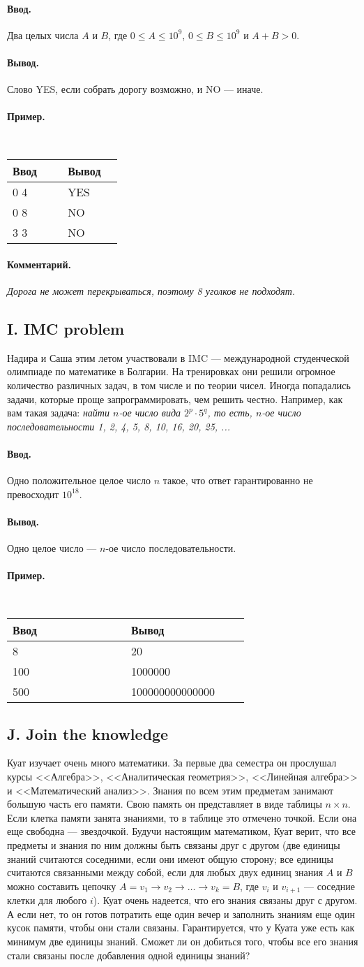 \documentclass[12pt, a4paper]{article}
\newcommand{\informat}[1]
{
	\paragraph{Ввод.\\} #1
}
\newcommand{\outformat}[1]
{
	\paragraph{Вывод.\\} #1
}
\newcommand{\exampleee}[6]
{
	\paragraph{Пример.\\}
	{\tt
	\begin{tabular}{|p{0.4\linewidth}|p{0.4\linewidth}|}
	\hline
	Ввод 	& Вывод  	\\
	\hline
	#1 		& #2 		\\
	\hline
	#3		& #4		\\
	\hline
	#5		& #6		\\
	\hline
	\end{tabular}
	}
}
\newcommand{\excomm}[1]
{
	\paragraph{Комментарий. \\}
	\textit{#1}
}
\begin{document}
\informat{Два целых числа $A$ и $B$, где $0 \le A \le 10^9$, $0 \le B \le 10^9$ и $A + B > 0$.}

\outformat{Слово YES, если собрать дорогу возможно, и NO --- иначе.}

\exampleee{0 4}{YES}{0 8}{NO}{3 3}{NO}

\excomm{Дорога не может перекрываться, поэтому 8 уголков не подходят.}


\subsection*{I. IMC problem}

Надира и Саша этим летом участвовали в IMC --- международной студенческой олимпиаде по математике в Болгарии. На тренировках они решили огромное количество различных задач, в том числе и по теории чисел. Иногда попадались задачи, которые проще запрограммировать, чем решить честно. Например, как вам такая задача:\newline
\textit{найти $n$-ое число вида $2^p \cdot 5^q$, то есть, $n$-ое число последовательности 1, 2, 4, 5, 8, 10, 16, 20, 25, ...}

\informat{Одно положительное целое число $n$ такое, что ответ гарантированно не превосходит $10^{18}$.}

\outformat{Одно целое число --- $n$-ое число последовательности.}

\exampleee{8}{20}{100}{1000000}{500}{100000000000000}

\newpage

\subsection*{J. Join the knowledge}

Куат изучает очень много математики. За первые два семестра он прослушал курсы <<Алгебра>>, <<Аналитическая геометрия>>, <<Линейная алгебра>> и <<Математический анализ>>. Знания по всем этим предметам занимают большую часть его памяти. Свою память он представляет в виде таблицы $n \times n$. Если клетка памяти занята знаниями, то в таблице это отмечено точкой. Если она еще свободна --- звездочкой. Будучи настоящим математиком, Куат верит, что все предметы и знания по ним должны быть связаны друг с другом (две единицы знаний считаются соседними, если они имеют общую сторону; все единицы считаются связанными между собой, если для любых двух единиц знания $A$ и $B$ можно составить цепочку $A = v_1 \rightarrow v_2 \rightarrow \dots \rightarrow v_k = B$, где $v_i$ и $v_{i+1}$ --- соседние клетки для любого $i$). Куат очень надеется, что его знания связаны друг с другом. А если нет, то он готов потратить еще один вечер и заполнить знаниям еще один кусок памяти, чтобы они стали связаны. Гарантируется, что у Куата уже есть как минимум две единицы знаний. Сможет ли он добиться того, чтобы все его знания стали связаны после добавления одной единицы знаний?
\end{document}
